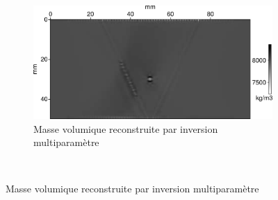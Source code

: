 \documentclass[a4paper,11pt]{report} %
\newenvironment{changemargin}[2]{\begin{list}{}{%
\setlength{\topsep}{0pt}%
\setlength{\leftmargin}{0pt}%
\setlength{\rightmargin}{0pt}%
\setlength{\listparindent}{\parindent}%
\setlength{\itemindent}{\parindent}%
\setlength{\parsep}{0pt plus 1pt}%
\addtolength{\leftmargin}{#1}%
\addtolength{\rightmargin}{#2}%
\setlength{\textwidth}{21cm}
}\item }{\end{list}}
\begin{document}
\begin{figure}[!h]
\begin{changemargin}{-2cm}{-2cm}
	\begin{subfigure}[b]{0.24\textwidth}
 		\includegraphics[width=\textwidth]{img/rho_6000k.png}
 		\caption{Masse volumique reconstruite par inversion multiparamètre}
	\end{subfigure}\\
	
	


\end{changemargin}
\end{figure}
\end{document}
